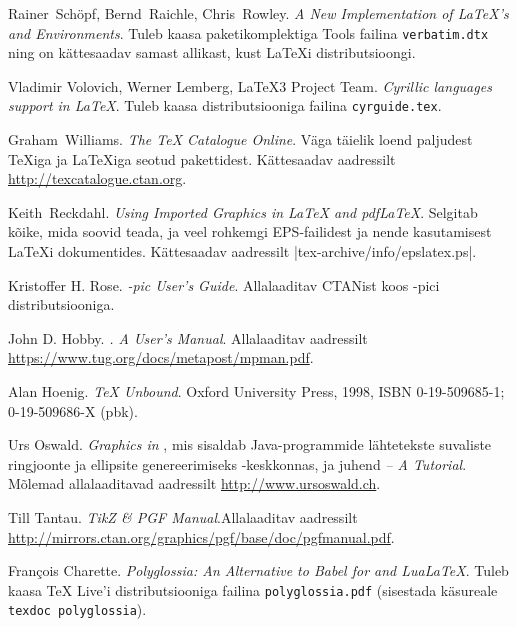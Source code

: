 \begin{thebibliography}{99}
 Rainer~Sch\"opf, Bernd~Raichle, Chris~Rowley.
  \newblock \emph{A New Implementation of \LaTeX's  and
   Environments}. \newblock Tuleb kaasa
  paketikomplektiga Tools failina \texttt{verbatim.dtx} ning on
  kättesaadav samast allikast, kust \LaTeX i distributsioongi.

 Vladimir Volovich, Werner Lemberg, \LaTeX3 Project
  Team. \newblock \emph{Cyrillic languages support in \LaTeX}. \newblock
  Tuleb kaasa \LaTeXe{} distributsiooniga failina \texttt{cyrguide.tex}.

 Graham~Williams.  \newblock \emph{The \TeX{}
  Catalogue Online}. Väga täielik loend paljudest \TeX iga ja \LaTeX iga
  seotud pakettidest. \newblock Kättesaadav aadressilt
  \url{http://texcatalogue.ctan.org}.

 Keith~Reckdahl.  \newblock \emph{Using Imported Graphics
  in \LaTeX{} and pdf\LaTeX}. Selgitab kõike, mida soovid teada, ja veel
  rohkemgi EPS-failidest ja nende kasutamisest \LaTeX i dokumentides.
  \newblock Kättesaadav aadressilt \CTAN|tex-archive/info/epslatex.ps|.

 Kristoffer H. Rose. \newblock \emph{\Xy-pic User's
  Guide}.  \newblock Allalaaditav CTANist koos \Xy-pici
  distributsiooniga.

 John D. Hobby. \newblock \emph{\MP. A User's Manual}.
  \newblock Allalaaditav aadressilt
  \url{https://www.tug.org/docs/metapost/mpman.pdf}.

 Alan Hoenig. \newblock \emph{\TeX{} Unbound}.
  \newblock Oxford University Press, 1998, ISBN 0-19-509685-1;
  0-19-509686-X (pbk).

 Urs Oswald. \newblock \emph{Graphics in \LaTeXe{}},
  mis sisaldab Java-programmide lähtetekste suvaliste ringjoonte ja
  ellipsite genereerimiseks -keskkonnas, ja juhend
  \emph{\MP{} -- A Tutorial}. \newblock Mõlemad allalaaditavad
  aadressilt \url{http://www.ursoswald.ch}.

 Till Tantau. \newblock \emph{TikZ \& PGF
  Manual}.\newblock Allalaaditav aadressilt
  \url{http://mirrors.ctan.org/graphics/pgf/base/doc/pgfmanual.pdf}.

 Fran\c{c}ois Charette. \newblock
  \emph{Polyglossia: An Alternative to Babel for  and
  Lua\LaTeX}. \newblock Tuleb kaasa \TeX{} Live'i distributsiooniga
  failina \texttt{polyglossia.pdf} (sisestada käsureale \texttt{texdoc
  polyglossia}).


\end{thebibliography}
